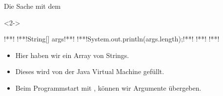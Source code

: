 \begin{frame}[fragile]{Die Sache mit dem }
\begin{uncoverenv}<2->
\begin{plainjava}[lineskip=4pt]
!**!
    !**!String[] args!**!
        !**!System.out.println(args.length);!**!
    !**!
!**!
\end{plainjava}
\end{uncoverenv}
\begin{itemize}[<+(1)->]
    \itemsep6pt
    \item<4-> Hier haben wir ein Array von Strings.
    \item<5-> Dieses wird von der Java Virtual Machine gefüllt.
    \item<7-> Beim Programmstart mit , können wir Argumente übergeben.
\end{itemize}
\end{frame}

